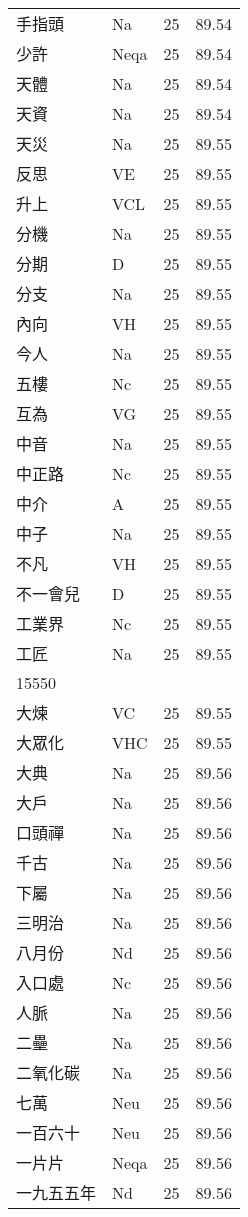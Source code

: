 \documentclass[twocolumn]{book}
\begin{document}
\begin{supertabular}{llrr}
手指頭 & Na & 25 &  89.54\\
少許 & Neqa & 25 &  89.54\\
天體 & Na & 25 &  89.54\\
天資 & Na & 25 &  89.54\\
天災 & Na & 25 &  89.55\\
反思 & VE & 25 &  89.55\\
升上 & VCL & 25 &  89.55\\
分機 & Na & 25 &  89.55\\
分期 & D & 25 &  89.55\\
分支 & Na & 25 &  89.55\\
內向 & VH & 25 &  89.55\\
今人 & Na & 25 &  89.55\\
五樓 & Nc & 25 &  89.55\\
互為 & VG & 25 &  89.55\\
中音 & Na & 25 &  89.55\\
中正路 & Nc & 25 &  89.55\\
中介 & A & 25 &  89.55\\
中子 & Na & 25 &  89.55\\
不凡 & VH & 25 &  89.55\\
不一會兒 & D & 25 &  89.55\\
工業界 & Nc & 25 &  89.55\\
工匠 & Na & 25 &  89.55\\
15550\\
大煉 & VC & 25 &  89.55\\
大眾化 & VHC & 25 &  89.55\\
大典 & Na & 25 &  89.56\\
大戶 & Na & 25 &  89.56\\
口頭禪 & Na & 25 &  89.56\\
千古 & Na & 25 &  89.56\\
下屬 & Na & 25 &  89.56\\
三明治 & Na & 25 &  89.56\\
八月份 & Nd & 25 &  89.56\\
入口處 & Nc & 25 &  89.56\\
人脈 & Na & 25 &  89.56\\
二壘 & Na & 25 &  89.56\\
二氧化碳 & Na & 25 &  89.56\\
七萬 & Neu & 25 &  89.56\\
一百六十 & Neu & 25 &  89.56\\
一片片 & Neqa & 25 &  89.56\\
一九五五年 & Nd & 25 &  89.56\\

\end{supertabular}
\end{document}
